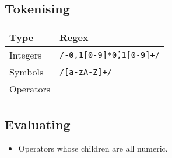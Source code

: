         \subsection*{Tokenising}
            \begin{tabular}{p{} | p{}}
                Type & Regex\footnotemark{} \\\hline
                Integers & \texttt{/-{0,1}[0-9]*\.{0,1}[0-9]+/} \\
                Symbols & \texttt{/[a-zA-Z]+/} \\
                Operators & \texttt{/[+\-/*^=%
                Braces &  \\
            \end{tabular}

        \subsection*{Evaluating}
            \begin{itemize}
                \item Operators whose children are all numeric.
            \end{itemize}

